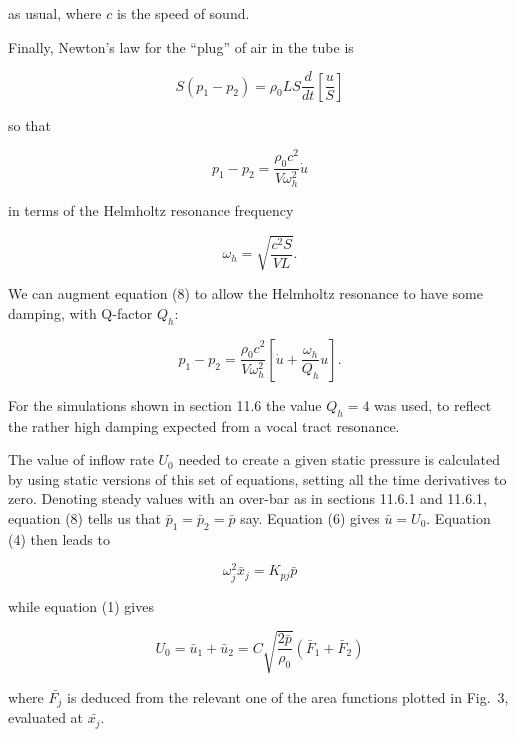   as usual, where $c$ is the speed of sound. 

  Finally, Newton's law for the ``plug'' of air in the tube is 

  $$S(p_1-p_2) = \rho_0 L S \dfrac{d}{dt}\left[\dfrac{u}{S}\right] \tag{7}$$ 

  so that 

  $$p_1-p_2=\dfrac{\rho_0 c^2}{V \omega_h^2} \dot{u} \tag{8}$$ 

  in terms of the Helmholtz resonance frequency 

  $$\omega_h=\sqrt{\dfrac{c^2 S}{VL}}. \tag{9}$$ 

  We can augment equation (8) to allow the Helmholtz resonance to have some 
  damping, with Q-factor $Q_h$: 

  $$p_1-p_2=\dfrac{\rho_0 c^2}{V \omega_h^2} \left[\dot{u}+ 
  \dfrac{\omega_h}{Q_h}u \right] . \tag{10}$$ 

  For the simulations shown in section 11.6 the value $Q_h=4$ was used, to 
  reflect the rather high damping expected from a vocal tract resonance. 

  The value of inflow rate $U_0$ needed to create a given static pressure is 
  calculated by using static versions of this set of equations, setting all the 
  time derivatives to zero. Denoting steady values with an over-bar as in 
  sections 11.6.1 and 11.6.1, equation (8) tells us that 
  $\bar{p}_1=\bar{p}_2=\bar{p}$ say. Equation (6) gives $\bar{u}=U_0$. Equation 
  (4) then leads to 

  $$\omega_j^2 \bar{x}_j=K_{pj} \bar{p} \tag{11}$$ 

  while equation (1) gives 

  $$U_0=\bar{u}_1+\bar{u}_2= C \sqrt{\dfrac{2 \bar{p}}{\rho_0}} 
  (\bar{F}_1+\bar{F}_2) \tag{12}$$ 

  where $\bar{F_j}$ is deduced from the relevant one of the area functions 
  plotted in Fig.\ 3, evaluated at $\bar{x_j}$. 